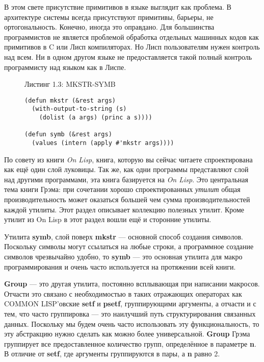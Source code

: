 В этом свете присутствие примитивов в языке выглядит как проблема. В архитектуре системы всегда присутствуют примитивы, барьеры, не ортогональность. Конечно, иногда это оправдано. Для большинства программистов не является проблемой обработка отдельных машинных кодов как примитивов в C или Лисп компиляторах. Но Лисп пользователям нужен контроль над всем. Ни в одном другом языке не предоставляется такой полный контроль программисту над языком как в Лиспе.

\begin{figure}Листинг 1.3: MKSTR-SYMB\label{listing_1.3}
\listbegin
\begin{verbatim}
(defun mkstr (&rest args)
  (with-output-to-string (s)
    (dolist (a args) (princ a s))))

(defun symb (&rest args)
  (values (intern (apply #'mkstr args))))
\end{verbatim}
\listend
\end{figure}

По совету из книги \emph{On Lisp}, книга, которую вы сейчас читаете спроектирована как ещё один слой луковицы. Так же, как одни программы представляют слой над другими программами, эта книга базируется на \emph{On Lisp}. Это центральная тема книги Грэма: при сочетании хорошо спроектированных \emph{утилит} общая производительность может оказаться большей чем сумма производительностей каждой утилиты. Этот раздел описывает коллекцию полезных утилит. Кроме утилит из On Lisp в этот раздел вошли ещё и сторонние утилиты.

Утилита \textbf{symb}, слой поверх \textbf{mkstr} --- основной способ создания символов. Поскольку символы могут ссылаться на любые строки, а программное создание символов чрезвычайно удобно, то \textbf{symb} --- это основная утилита для макро программирования и очень часто используется на протяжении всей книги.

\textbf{Group} --- это другая утилита, постоянно всплывающая при написании макросов. Отчасти это связано с необходимостью в таких отражающих операторах как COMMON LISP'овские \textbf{setf} и \textbf{psetf}, группирующими аргументы, а отчасти и с тем, что часто группировка --- это наилучший путь структурирования связанных данных. Поскольку мы будем очень часто использовать эту функциональность, то эту абстракцию нужно сделать как можно более универсальной. \textbf{Group} Грэма группирует все предоставленное количество групп, определённое в параметре \textbf{n}. В отличие от \textbf{setf}, где аргументы группируются в пары, а \textbf{n} равно 2.

